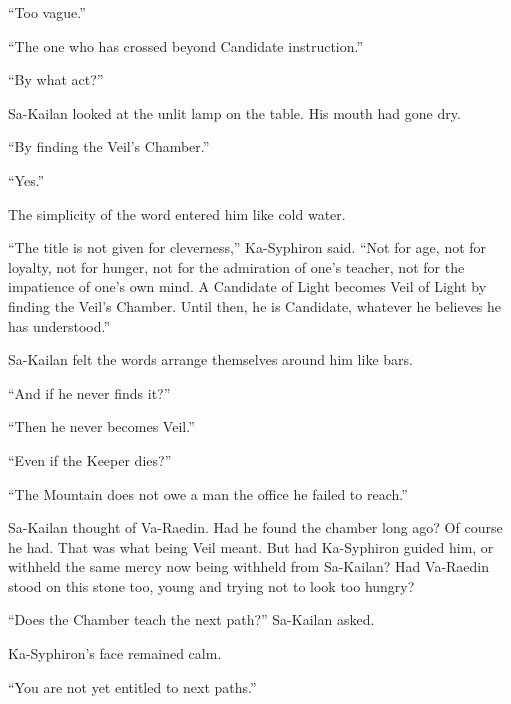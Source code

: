 “Too vague.”\par

“The one who has crossed beyond Candidate instruction.”\par

“By what act?”\par

Sa-Kailan looked at the unlit lamp on the table. His mouth had gone dry.\par

“By finding the Veil’s Chamber.”\par

“Yes.”\par

The simplicity of the word entered him like cold water.\par

“The title is not given for cleverness,” Ka-Syphiron said. “Not for age, not for loyalty, not for hunger, not for the admiration of one’s teacher, not for the impatience of one’s own mind. A Candidate of Light becomes Veil of Light by finding the Veil’s Chamber. Until then, he is Candidate, whatever he believes he has understood.”\par

Sa-Kailan felt the words arrange themselves around him like bars.\par

“And if he never finds it?”\par

“Then he never becomes Veil.”\par

“Even if the Keeper dies?”\par

“The Mountain does not owe a man the office he failed to reach.”\par

Sa-Kailan thought of Va-Raedin. Had he found the chamber long ago? Of course he had. That was what being Veil meant. But had Ka-Syphiron guided him, or withheld the same mercy now being withheld from Sa-Kailan? Had Va-Raedin stood on this stone too, young and trying not to look too hungry?\par

“Does the Chamber teach the next path?” Sa-Kailan asked.\par

Ka-Syphiron’s face remained calm.\par

“You are not yet entitled to next paths.”\par

